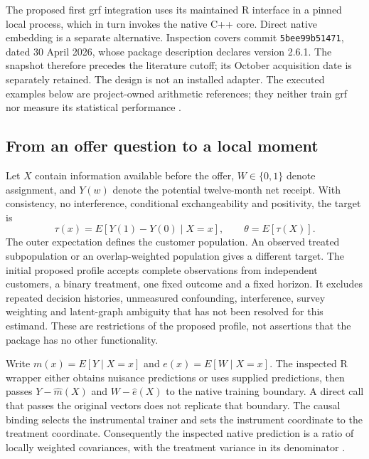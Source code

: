 The proposed first grf integration uses its maintained R interface in a
pinned local process, which in turn invokes the native C++ core. Direct
native embedding is a separate alternative. Inspection covers commit
\texttt{5bee99b51471}, dated 30 April 2026, whose package description
declares version 2.6.1. The snapshot therefore precedes the literature
cutoff; its October acquisition date is separately retained. The design
is not an installed adapter. The executed examples below are
project-owned arithmetic references; they neither train grf nor measure
its statistical performance
\cite{exec13_grf_runtime,exec13_grf_design,exec13_grf_oracle}.

\subsection{From an offer question to a local moment}

Let \(X\) contain information available before the offer,
\(W\in\{0,1\}\) denote assignment, and \(Y(w)\) denote the potential
twelve-month net receipt. With consistency, no interference, conditional
exchangeability and positivity, the target is \[
 \tau(x)=E[Y(1)-Y(0)\mid X=x],\qquad
 \theta=E[\tau(X)].
\] The outer expectation defines the customer population. An observed
treated subpopulation or an overlap-weighted population gives a
different target. The initial proposed profile accepts complete
observations from independent customers, a binary treatment, one fixed
outcome and a fixed horizon. It excludes repeated decision histories,
unmeasured confounding, interference, survey weighting and latent-graph
ambiguity that has not been resolved for this estimand. These are
restrictions of the proposed profile, not assertions that the package
has no other functionality.

Write \(m(x)=E[Y\mid X=x]\) and \(e(x)=E[W\mid X=x]\). The inspected R
wrapper either obtains nuisance predictions or uses supplied
predictions, then passes \(Y-\widehat m(X)\) and \(W-\widehat e(X)\) to
the native training boundary. A direct call that passes the original
vectors does not replicate that boundary. The causal binding selects the
instrumental trainer and sets the instrument coordinate to the treatment
coordinate. Consequently the inspected native prediction is a ratio of
locally weighted covariances, with the treatment variance in its
denominator \cite{exec13_grf_rpath,exec13_grf_native}.

